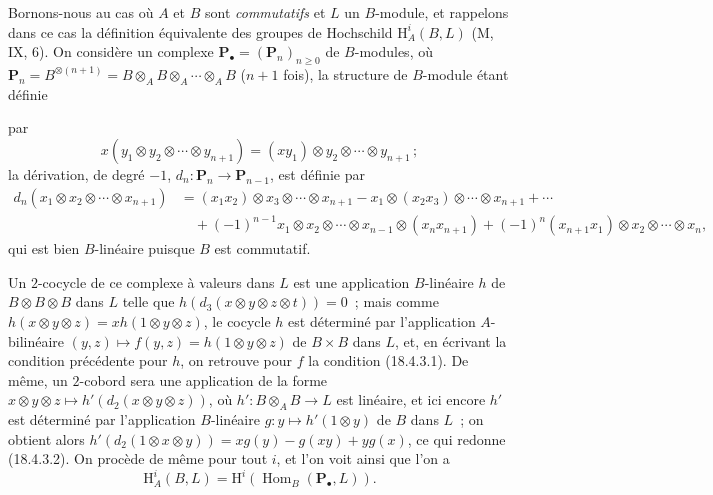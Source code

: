 \begin{env}[18.4.4]
\label{0.18.4.4-fr}
Bornons-nous au cas où $A$ et $B$ sont \emph{commutatifs} et $L$ un
$B$-module, et rappelons dans ce cas la définition équivalente des groupes de
Hochschild $\mathrm H_A^i(B,L)$ (M, IX, 6). On considère un complexe
$\mathbf P_\bullet=(\mathbf P_n)_{n\geqslant0}$ de $B$-modules, où
$\mathbf P_n=B^{\otimes(n+1)}=B\otimes_A B\otimes_A\cdots\otimes_A B$
($n+1$ fois), la structure de $B$-module étant définie


par
\[
  x(y_1\otimes y_2\otimes\cdots\otimes y_{n+1})
  =(xy_1)\otimes y_2\otimes\cdots\otimes y_{n+1}\,;
\]
la dérivation, de degré $-1$, $d_n:\mathbf P_n\to\mathbf P_{n-1}$, est
définie par
\begin{align*}
  d_n(x_1\otimes x_2\otimes\cdots\otimes x_{n+1})
    &=(x_1x_2)\otimes x_3\otimes\cdots\otimes x_{n+1}
      -x_1\otimes(x_2x_3)\otimes\cdots\otimes x_{n+1}+\cdots\\
    &\quad+(-1)^{n-1}x_1\otimes x_2\otimes\cdots\otimes x_{n-1}
      \otimes(x_nx_{n+1})
      +(-1)^n(x_{n+1}x_1)\otimes x_2\otimes\cdots\otimes x_n,
\end{align*}
qui est bien $B$-linéaire puisque $B$ est commutatif.

Un $2$-cocycle de ce complexe à valeurs dans $L$ est une application
$B$-linéaire $h$ de $B\otimes B\otimes B$ dans $L$ telle que
$h(d_3(x\otimes y\otimes z\otimes t))=0$~; mais comme
$h(x\otimes y\otimes z)=xh(1\otimes y\otimes z)$, le cocycle $h$ est déterminé
par l'application $A$-bilinéaire
$(y,z)\longmapsto f(y,z)=h(1\otimes y\otimes z)$ de $B\times B$ dans $L$, et,
en écrivant la condition précédente pour $h$, on retrouve pour $f$ la
condition (18.4.3.1). De même, un $2$-cobord sera une application de la forme
$x\otimes y\otimes z\longmapsto h'(d_2(x\otimes y\otimes z))$, où
$h':B\otimes_A B\to L$ est linéaire, et ici encore $h'$ est déterminé par
l'application $B$-linéaire $g:y\longmapsto h'(1\otimes y)$ de $B$ dans $L$~;
on obtient alors
$h'(d_2(1\otimes x\otimes y))=xg(y)-g(xy)+yg(x)$, ce qui redonne (18.4.3.2).
On procède de même pour tout $i$, et l'on voit ainsi que l'on a
\begin{equation}
\label{0.18.4.4.1-fr}
\tag{18.4.4.1}
  \mathrm H_A^i(B,L)=\mathrm H^i(\operatorname{Hom}_B(\mathbf P_\bullet,L)).
\end{equation}
\end{env}

